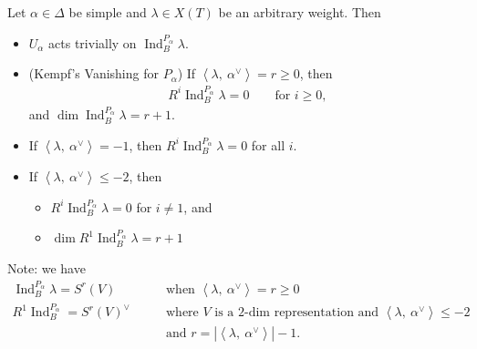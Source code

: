 \begin{proposition}[?]

\begin{proposition}[?]

Let \(\alpha\in\Delta\) be simple and \(\lambda \in X(T)\) be an
arbitrary weight. Then

\begin{itemize}
\item
  \(U_\alpha\) acts trivially on
  \(\operatorname{Ind}_B^{P_\alpha} \lambda\).
\item
  (Kempf's Vanishing for \(P_\alpha\)) If
  \({\left\langle {\lambda},~{\alpha^\vee} \right\rangle} = r \geq 0\),
  then
  \begin{align*}       R^i \operatorname{Ind}_B^{P_\alpha} \lambda = 0 \qquad \text{for } i \geq 0     ,\end{align*}
  and \(\dim \operatorname{Ind}_B^{P_\alpha}\lambda = r + 1\).
\item
  If \({\left\langle {\lambda},~{\alpha^\vee} \right\rangle} = -1\),
  then \(R^i \operatorname{Ind}_B^{P_\alpha} \lambda = 0\) for all
  \(i\).
\item
  If \({\left\langle {\lambda},~{\alpha^\vee} \right\rangle} \leq -2\),
  then

  \begin{itemize}
  \item
    \(R^i \operatorname{Ind}_B^{P_\alpha} \lambda = 0\) for
    \(i \neq 1\), and
  \item
    \(\dim R^1 \operatorname{Ind}_B^{P_\alpha} \lambda = r+1\)
  \end{itemize}
\end{itemize}

Note: we have
\begin{align*}   \operatorname{Ind}_B^{P_\alpha} \lambda = S^r(V) \qquad &\text{when } {\left\langle {\lambda},~{\alpha^\vee} \right\rangle} = r \geq 0 \\ R^1 \operatorname{Ind}_B^{P_\alpha} = S^r(V)^\vee\qquad&\text{where $V$ is a 2-dim representation and } {\left\langle {\lambda},~{\alpha^\vee} \right\rangle} \leq -2 \\ &\text{and } r = {\left\lvert {{\left\langle {\lambda},~{\alpha^\vee} \right\rangle}} \right\rvert} - 1 .\end{align*}

\end{proposition}

\end{proposition}

